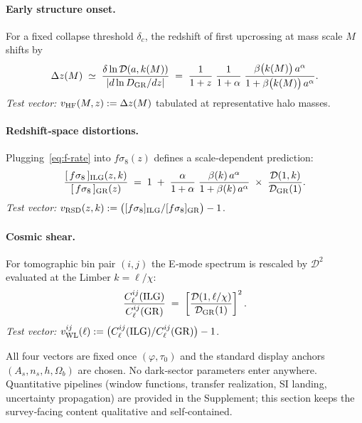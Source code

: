 \documentclass[11pt]{article}
\begin{document}
\paragraph{Early structure onset.}
For a fixed collapse threshold $\delta_{c}$, the redshift of first upcrossing at mass scale $M$ shifts by
\begin{equation}
\Delta z(M)\;\simeq\;\frac{\delta\ln\mathcal D(a,k(M))}{\left|d\ln D_{\rm GR}/dz\right|}\;=\;
\frac{1}{1+z}\;\frac{1}{1+\alpha}\;\frac{\beta\bigl(k(M)\bigr)\,a^{\alpha}}{1+\beta\bigl(k(M)\bigr)\,a^{\alpha}}.
\end{equation}
\emph{Test vector:} $v_{\rm HF}(M,z):=\Delta z(M)$ tabulated at representative halo masses.

\paragraph{Redshift‑space distortions.}
Plugging~\eqref{eq:f-rate} into $f\sigma_{8}(z)$ defines a scale‑dependent prediction:
\begin{equation}
\frac{[\,f\sigma_{8}\,]_{\rm ILG}(z,k)}{[\,f\sigma_{8}\,]_{\rm GR}(z)}\;=\;
1\;+\;\frac{\alpha}{1+\alpha}\;\frac{\beta(k)\,a^{\alpha}}{1+\beta(k)\,a^{\alpha}}\;\times\;\frac{\mathcal D(1,k)}{\mathcal D_{\rm GR}(1)}.
\end{equation}
\emph{Test vector:} $v_{\rm RSD}(z,k):=\bigl([f\sigma_{8}]_{\rm ILG}/[f\sigma_{8}]_{\rm GR}\bigr)-1$.

\paragraph{Cosmic shear.}
For tomographic bin pair $(i,j)$ the E‑mode spectrum is rescaled by $\mathcal D^{2}$ evaluated at the Limber $k=\ell/\chi$:
\begin{equation}
\frac{C_{\ell}^{ij}({\rm ILG})}{C_{\ell}^{ij}({\rm GR})}\;=\;
\left[\frac{\mathcal D\!\left(1,\ell/\chi\right)}{\mathcal D_{\rm GR}(1)}\right]^{2}.
\end{equation}
\emph{Test vector:} $v_{\rm WL}^{ij}(\ell):=\bigl(C_{\ell}^{ij}({\rm ILG})/C_{\ell}^{ij}({\rm GR})\bigr)-1$.

\medskip
\noindent All four vectors are fixed once $(\varphi,\tau_{0})$ and the standard display anchors $(A_{s},n_{s},h,\Omega_{b})$ are chosen. No dark‑sector parameters enter anywhere. Quantitative pipelines (window functions, transfer realization, SI landing, uncertainty propagation) are provided in the Supplement; this section keeps the survey‑facing content qualitative and self‑contained.
\end{document}
